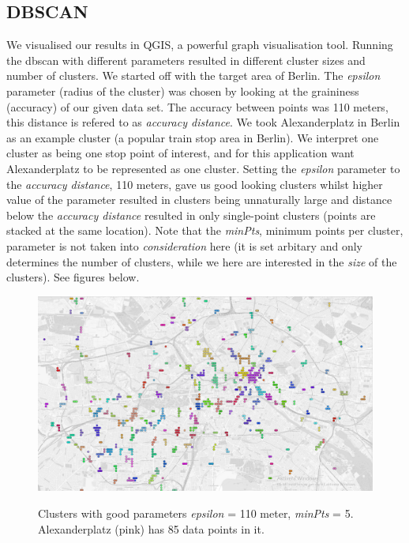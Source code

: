\subsection{DBSCAN}

We visualised our results in QGIS, a powerful graph visualisation tool. Running the dbscan with different parameters resulted in different cluster sizes and number of clusters. We started off with the target area of Berlin. The \textit{epsilon} parameter (radius of the cluster) was chosen by looking at the graininess (accuracy) of our given data set. The accuracy between points was 110 meters, this distance is refered to as \textit{accuracy distance}.
We took Alexanderplatz in Berlin as an example cluster (a popular train stop area in Berlin). We interpret one cluster as being one stop point of interest, and for this application want Alexanderplatz to be represented as one cluster. Setting the \textit{epsilon} parameter to the \textit{accuracy distance},  110 meters, gave us good looking clusters whilst higher value of the parameter resulted in clusters being unnaturally large and distance below the \textit{accuracy distance} resulted in only single-point clusters (points are stacked at the same location). Note that the \textit{minPts}, minimum points per cluster, parameter is not taken into \textit{consideration} here (it is set arbitary and only determines the number of clusters, while we here are interested in the \textit{size} of the clusters). See figures below.

\begin{figure}[!ht]
	\centering
	\includegraphics[width=1\textwidth]{images/0,001_5_gray.png}\\
	\caption{ Clusters with good parameters \textit{epsilon} = 110 meter, \textit{minPts} = 5. Alexanderplatz (pink) has 85 data points in it.  }
	\label{fig:0.001_5_gray}
\end{figure}

